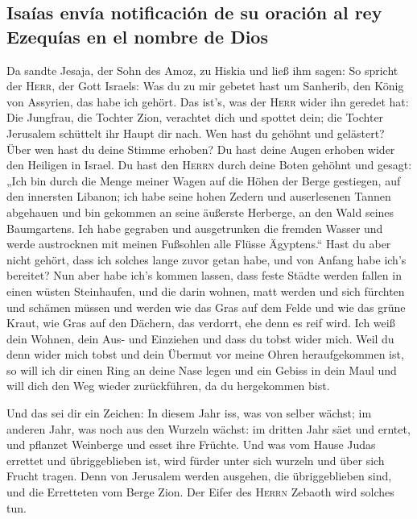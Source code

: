 \hypertarget{isauxedas-envuxeda-notificaciuxf3n-de-su-oraciuxf3n-al-rey-ezequuxedas-en-el-nombre-de-dios}{%
\subsection{Isaías envía notificación de su oración al rey Ezequías en
el nombre de
Dios}\label{isauxedas-envuxeda-notificaciuxf3n-de-su-oraciuxf3n-al-rey-ezequuxedas-en-el-nombre-de-dios}}

 Da sandte Jesaja, der Sohn des Amoz, zu Hiskia und ließ
ihm sagen: So spricht der \textsc{Herr}, der Gott Israels: Was du zu mir
gebetet hast um Sanherib, den König von Assyrien, das habe ich gehört.
 Das ist's, was der \textsc{Herr} wider ihn geredet hat:
Die Jungfrau, die Tochter Zion, verachtet dich und spottet dein; die
Tochter Jerusalem schüttelt ihr Haupt dir nach.  Wen hast
du gehöhnt und gelästert? Über wen hast du deine Stimme erhoben? Du hast
deine Augen erhoben wider den Heiligen in Israel.  Du
hast den \textsc{Herrn} durch deine Boten gehöhnt und gesagt: „Ich bin
durch die Menge meiner Wagen auf die Höhen der Berge gestiegen, auf den
innersten Libanon; ich habe seine hohen Zedern und auserlesenen Tannen
abgehauen und bin gekommen an seine äußerste Herberge, an den Wald
seines Baumgartens.  Ich habe gegraben und ausgetrunken
die fremden Wasser und werde austrocknen mit meinen Fußsohlen alle
Flüsse Ägyptens.``  Hast du aber nicht gehört, dass ich
solches lange zuvor getan habe, und von Anfang habe ich's bereitet? Nun
aber habe ich's kommen lassen, dass feste Städte werden fallen in einen
wüsten Steinhaufen,  und die darin wohnen, matt werden
und sich fürchten und schämen müssen und werden wie das Gras auf dem
Felde und wie das grüne Kraut, wie Gras auf den Dächern, das verdorrt,
ehe denn es reif wird.  Ich weiß dein Wohnen, dein Aus-
und Einziehen und dass du tobst wider mich.  Weil du denn
wider mich tobst und dein Übermut vor meine Ohren heraufgekommen ist, so
will ich dir einen Ring an deine Nase legen und ein Gebiss in dein Maul
und will dich den Weg wieder zurückführen, da du hergekommen bist.

 Und das sei dir ein Zeichen: In diesem Jahr iss, was von
selber wächst; im anderen Jahr, was noch aus den Wurzeln wächst: im
dritten Jahr säet und erntet, und pflanzet Weinberge und esset ihre
Früchte.  Und was vom Hause Judas errettet und
übriggeblieben ist, wird fürder unter sich wurzeln und über sich Frucht
tragen.  Denn von Jerusalem werden ausgehen, die
übriggeblieben sind, und die Erretteten vom Berge Zion. Der Eifer des
\textsc{Herrn} Zebaoth wird solches tun.

